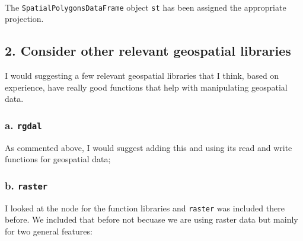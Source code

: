 \documentclass[11pt,a4paper]{article}
\begin{document}
~

The \texttt{SpatialPolygonsDataFrame} object \texttt{st} has been
assigned the appropriate projection.

\newpage

\hypertarget{consider-other-relevant-geospatial-libraries}{%
\subsection{2. Consider other relevant geospatial
libraries}\label{consider-other-relevant-geospatial-libraries}}

I would suggesting a few relevant geospatial libraries that I think,
based on experience, have really good functions that help with
manipulating geospatial data.

\hypertarget{a.-rgdal}{%
\subsubsection{\texorpdfstring{a.
\texttt{rgdal}}{a. rgdal}}\label{a.-rgdal}}

As commented above, I would suggest adding this and using its read and
write functions for geospatial data;

\hypertarget{b.-raster}{%
\subsubsection{\texorpdfstring{b.
\texttt{raster}}{b. raster}}\label{b.-raster}}

I looked at the node for the function libraries and \texttt{raster} was
included there before. We included that before not becuase we are using
raster data but mainly for two general features:
\end{document}
